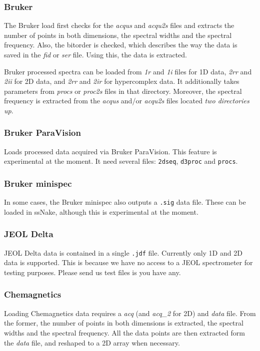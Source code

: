 \documentclass[11pt,a4paper]{article}
\begin{document}
\subsubsection*{Bruker}
The Bruker load first checks for the \textit{acqus} and \textit{acqu2s} files and extracts the number of points in both dimensions, the spectral widths and the spectral frequency. Also, the bitorder is checked, which describes the way the data is saved in the \textit{fid} or \textit{ser} file. Using this, the data is extracted.

Bruker processed spectra can be loaded from \textit{1r} and \textit{1i} files for 1D data, \textit{2rr} and \textit{2ii} for 2D data, and \textit{2rr} and \textit{2ir} for hypercomplex data. It additionally takes parameters from \textit{procs} or \textit{proc2s} files in that directory. Moreover, the spectral frequency is extracted from the \textit{acqus} and/or \textit{acqu2s} files located \textit{two directories up}.

\subsubsection*{Bruker ParaVision}
Loads processed data acquired via Bruker ParaVision. This feature is experimental at the moment. It need several files: \texttt{2dseq}, \texttt{d3proc} and \texttt{procs}.

\subsubsection*{Bruker minispec}
In some cases, the Bruker minispec also outputs a \texttt{.sig} data file. These can be loaded in ssNake, although this is experimental at the moment.

\subsubsection*{JEOL Delta}
JEOL Delta data is contained in a single \texttt{.jdf} file. Currently only 1D and 2D data is
 supported. This is because we have no access to a JEOL spectrometer for testing
purposes. Please send us test files is you have any.

\subsubsection*{Chemagnetics}
Loading Chemagnetics data requires a \textit{acq} (and \textit{acq\_2} for 2D) and \textit{data} file. From the former, the number of points in both dimensions is extracted, the spectral widths and the spectral frequency. All the data points are then extracted form the \textit{data} file, and reshaped to a 2D array when necessary.
\end{document}
